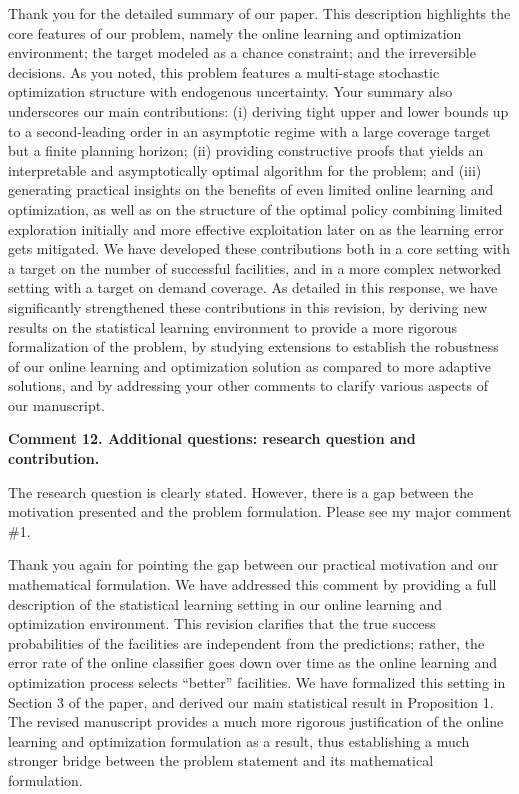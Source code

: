 \documentclass[11pt]{article}
\begin{document}
Thank you for the detailed summary of our paper. This description highlights the core features of our problem, namely the online learning and optimization environment; the target modeled as a chance constraint; and the irreversible decisions. As you noted, this problem features a multi-stage stochastic optimization structure with endogenous uncertainty. Your summary also underscores our main contributions: (i) deriving tight upper and lower bounds up to a second-leading order in an asymptotic regime with a large coverage target but a finite planning horizon; (ii) providing constructive proofs that yields an interpretable and asymptotically optimal algorithm for the problem; and (iii) generating practical insights on the benefits of even limited online learning and optimization, as well as on the structure of the optimal policy combining limited exploration initially and more effective exploitation later on as the learning error gets mitigated. We have developed these contributions both in a core setting with a target on the number of successful facilities, and in a more complex networked setting with a target on demand coverage. As detailed in this response, we have significantly strengthened these contributions in this revision, by deriving new results on the statistical learning environment to provide a more rigorous formalization of the problem, by studying extensions to establish the robustness of our online learning and optimization solution as compared to more adaptive solutions, and by addressing your other comments to clarify various aspects of our manuscript.

\begin{commentBox}
    \textbf{Comment 12. Additional questions: research question and contribution.}\label{R2:12}

    The research question is clearly stated. However, there is a gap between the motivation presented and the problem formulation. Please see my major comment \#1.
\end{commentBox}

Thank you again for pointing the gap between our practical motivation and our mathematical formulation. We have addressed this comment by providing a full description of the statistical learning setting in our online learning and optimization environment. This revision clarifies that the true success probabilities of the facilities are independent from the predictions; rather, the error rate of the online classifier goes down over time as the online learning and optimization process selects ``better'' facilities. We have formalized this setting in Section 3 of the paper, and derived our main statistical result in Proposition 1. The revised manuscript provides a much more rigorous justification of the online learning and optimization formulation as a result, thus establishing a much stronger bridge between the problem statement and its mathematical formulation.
\end{document}
